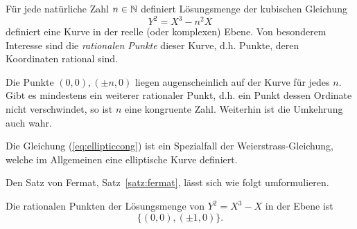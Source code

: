Für jede natürliche Zahl $n\in{\mathbb{N}}$ definiert
Lösungsmenge der kubischen Gleichung
\begin{equation}
  \label{eq:ellipticcong}
  Y^2 = X^3-n^2X  
\end{equation}
definiert eine Kurve in der reelle (oder komplexen) Ebene. Von besonderem Interesse sind die
\emph{rationalen Punkte} dieser Kurve, d.h. Punkte, deren Koordinaten
rational sind.

Die Punkte $(0,0),(\pm n,0)$ liegen augenscheinlich auf der Kurve für
jedes $n$. Gibt es mindestens ein weiterer rationaler Punkt, d.h. ein
Punkt dessen Ordinate nicht verschwindet, so ist $n$ eine kongruente
Zahl.
Weiterhin ist die Umkehrung auch wahr. 


Die Gleichung (\ref{eq:ellipticcong}) ist ein Spezialfall der
Weierstrass-Gleichung, welche im Allgemeinen eine elliptische Kurve
definiert.

Den Satz von Fermat, Satz~\ref{satz:fermat}, lässt sich wie folgt
umformulieren.

\begin{theorem}
  \label{satz:fermat2}
  Die rationalen Punkten der Lösungsmenge von $Y^2 = X^3-X$ in der Ebene ist
  $$
  \{(0,0),(\pm 1,0)\}.
  $$
\end{theorem}


